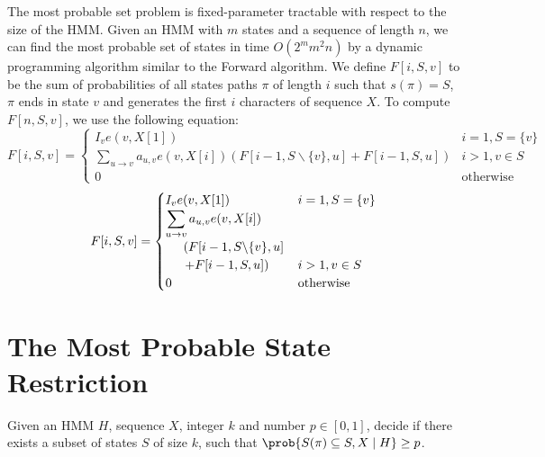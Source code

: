 The most probable set problem is
fixed-parameter tractable with respect to the size of the HMM. Given
an HMM with $m$ states and a sequence of length $n$, we can find the
most probable set of states in time $O(2^m m^2 n)$ by a dynamic
programming algorithm similar to the Forward algorithm.
We define $F[i,S,v]$ to be the sum of probabilities of all
states paths $\pi$ of length $i$ such that $s(\pi)=S$, $\pi$ ends in
state $v$ and generates the first $i$ characters of sequence $X$.
To compute $F[n,S,v]$, we use the following equation:
\ifx\settwocolumn\undefined
$$F[i,S,v] = \begin{cases}
I_{v}e(v,X[1])& i=1,S=\{v\}\\ 
\displaystyle \sum_{u\to v}a_{u,v}e(v,X[i])\left(F[i-1,S\backslash\{v\},u]
+ F[i-1,S,u]\right) & i>1, v\in S\\
0 & \mbox{otherwise}
\end{cases}$$
\else
$$F[i,S,v] = \begin{cases}
I_{v}e(v,X[1])& i=1,S=\{v\}\\ 
\displaystyle \sum_{u\to v}a_{u,v}e(v,X[i])\\\hspace{5mm}\left(F[i-1,S\backslash\{v\},u]\right.
\\\hspace{5mm}\left.
+ F[i-1,S,u]\right) & i>1, v\in S\\
0 & \mbox{otherwise}
\end{cases}$$
\fi
\section{The Most Probable State Restriction}

\label{sec:restriction}


\begin{definition*}
Given an HMM $H$, sequence $X$, integer $k$ and number $p\in[0,1]$, decide if
there exists a subset of states $S$ of size $k$, such that
$\prob{S(\pi)\subseteq S, X\mid H} \geq p$.  
\end{definition*}


